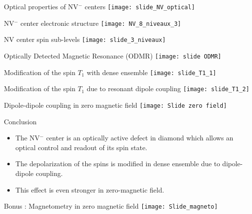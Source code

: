 \documentclass{beamer}
\begin{document}
\begin{frame}{Optical properties of NV$^-$ centers}
\centering
\texttt{[image: slide\_NV\_optical]}
\end{frame}
\begin{frame}{NV$^-$ center electronic structure}
\centering
\texttt{[image: NV\_8\_niveaux\_3]}
\end{frame}
\begin{frame}{NV center spin sub-levels}
\centering
\texttt{[image: slide\_3\_niveaux]}
\end{frame}
\begin{frame}{Optically Detected Magnetic Resonance (ODMR)}
\centering
\texttt{[image: slide ODMR]}
\end{frame}
\begin{frame}{Modification of the spin $T_1$ with dense ensemble}
\centering
\texttt{[image: slide\_T1\_1]}
\end{frame}
\begin{frame}{Modification of the spin $T_1$ due to resonant dipole coupling}
\centering
\texttt{[image: slide\_T1\_2]}
\end{frame}
\begin{frame}{Dipole-dipole coupling in zero magnetic field}
\centering
\texttt{[image: Slide zero field]}
\end{frame}
\begin{frame}{Conclusion}
\begin{itemize}
\item The NV$^-$ center is an optically active defect in diamond which allows an optical control and readout of its spin state.
\bigskip
\item The depolarization of the spins is modified in dense ensemble due to dipole-dipole coupling.
\bigskip
\item This effect is even stronger in zero-magnetic field.
\end{itemize}
\end{frame}
\begin{frame}{Bonus : Magnetometry in zero magnetic field}
\centering
\texttt{[image: Slide\_magneto]}
\end{frame}
\end{document}
